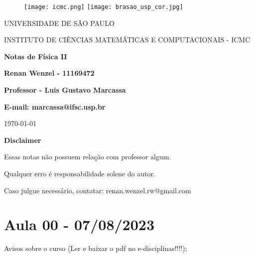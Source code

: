 \documentclass{article}
\begin{document}
\begin{figure}[ht]
	\texttt{[image: icmc.png]}
	\hspace{7cm}
	\texttt{[image: brasao\_usp\_cor.jpg]}
	\endminipage
\end{figure}

\begin{center}
	\vspace{1cm}
	\LARGE
	UNIVERSIDADE DE S\~AO PAULO

	\vspace{1.3cm}
	\LARGE
	INSTITUTO DE CI\^ENCIAS MATEM\'ATICAS E COMPUTACIONAIS - ICMC

	\vspace{1.7cm}
	\Large
	\textbf{Notas de Física II}

	\vspace{1.3cm}
	\large
	\textbf{Renan Wenzel - 11169472}

	\vspace{1.3cm}
	\large
	\textbf{Professor - Luis Gustavo Marcassa}

	\textbf{E-mail: marcassa@ifsc.usp.br}

	\vspace{1.3cm}
	\today
\end{center}

\newpage
\textbf{{\Huge Disclaimer}}
\vspace{5cm}

{\huge Essas notas não possuem relação com professor algum.

	Qualquer erro é responsabilidade solene do autor.

	Caso julgue necessário, contatar: renan.wenzel.rw@gmail.com}
\newpage

\tableofcontents

\newpage

\section{Aula 00 - 07/08/2023}
Avisos sobre o curso (Ler e baixar o pdf no e-disciplinas!!!!);

\newpage

\newpage

\newpage

\newpage

\newpage

\newpage

\newpage

\newpage

\newpage

\newpage

\newpage

\newpage

\newpage

\newpage

\newpage

\newpage

\newpage

\newpage

\newpage

\newpage

\newpage

\newpage

\newpage

\newpage

\newpage

\newpage

\newpage

\newpage

\newpage

\newpage

\newpage

\newpage

\newpage

\newpage
\end{document}
